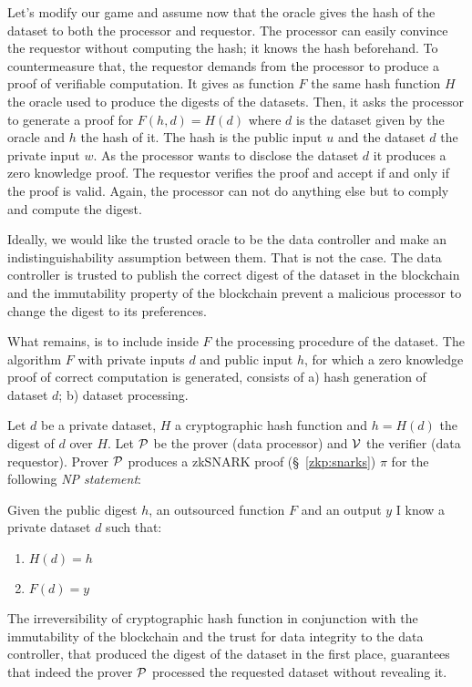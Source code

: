 Let's modify our game and assume now that the oracle gives the hash of the dataset to both the processor and requestor. The processor can easily convince the requestor without computing the hash; it knows the hash beforehand. To countermeasure that, the requestor demands from the processor to produce a proof of verifiable computation. It gives as function $F$ the same hash function $H$ the oracle used to produce the digests of the datasets. Then, it asks the processor to generate a proof for $F(h, d) = H(d)$ where $d$ is the dataset given by the oracle and $h$ the hash of it. The hash is the public input $u$ and the dataset $d$ the private input $w$. As the processor wants to disclose the dataset $d$ it produces a zero knowledge proof. The requestor verifies the proof and accept if and only if the proof is valid. Again, the processor can not do anything else but to comply and compute the digest.

Ideally, we would like the trusted oracle to be the data controller and make an indistinguishability assumption between them. That is not the case. The data controller is trusted to publish the correct digest of the dataset in the blockchain and the immutability property of the blockchain prevent a malicious processor to change the digest to its preferences.

What remains, is to include inside $F$ the processing procedure of the dataset. The algorithm $F$ with private inputs $d$ and public input $h$, for which a zero knowledge proof of correct computation is generated, consists of a) hash generation of dataset $d$; b) dataset processing.

Let $d$ be a private dataset, $H$ a cryptographic hash function and $h = H(d)$ the digest of $d$ over $H$. Let $\mathcal{P}$ be the prover (data processor) and $\mathcal{V}$ the verifier (data requestor). Prover $\mathcal{P}$ produces a zkSNARK proof (§~\ref{zkp:snarks}) $\pi$ for the following \textit{NP statement}:

Given the public digest $h$, an outsourced function $F$ and an output $y$ I know a private dataset $d$ such that:
  \begin{enumerate}
    \item $H(d) = h$
    \item $F(d) = y$
  \end{enumerate}

The irreversibility of cryptographic hash function in conjunction with the immutability of the blockchain and the trust for data integrity to the data controller, that produced the digest of the dataset in the first place, guarantees that indeed the prover $\mathcal{P}$ processed the requested dataset without revealing it.

